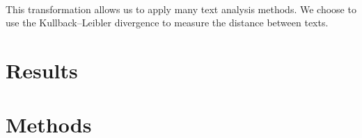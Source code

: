 \documentclass[11pt]{article} %
\begin{document}
\paragraph{} This transformation allows us to apply many text analysis methods. We choose to use the Kullback–Leibler divergence to measure the distance between texts. 







\section{Results} %
\label{sec:results}


\section{Methods} %
\label{sec:methods}


\printbibliography
    
\end{document}
